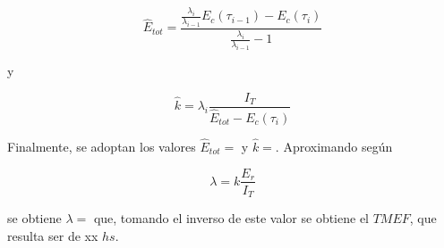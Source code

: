 \begin{equation}
\hat{E}_{tot} = \frac{ \frac{\lambda_i}{\lambda_{i-1}} E_c(\tau_{i-1})-E_c(\tau_i)}{\frac{\lambda_i}{\lambda_{i-1}}-1}
\end{equation}

y

\begin{equation}
\hat{k} = \lambda_i\frac{I_T}{\hat{E}_{tot}-E_c(\tau_i)}
\end{equation}

Finalmente, se adoptan los valores $\hat{E}_{tot} = $ y $\hat{k} = $. Aproximando según

\begin{equation}
\lambda = k\frac{E_r}{I_T}
\end{equation}

se obtiene $\lambda = $ que, tomando el inverso de este valor se obtiene el $TMEF$, que resulta ser de xx $hs$.



%
